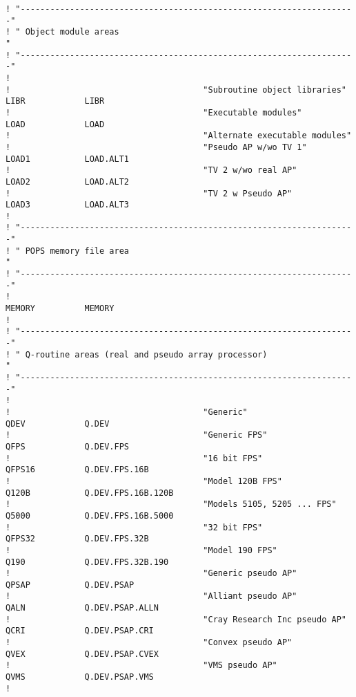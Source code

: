 \begin{verbatim}
! "--------------------------------------------------------------------"
! " Object module areas                                                "
! "--------------------------------------------------------------------"
!
!                                       "Subroutine object libraries"
LIBR            LIBR
!                                       "Executable modules"
LOAD            LOAD
!                                       "Alternate executable modules"
!                                       "Pseudo AP w/wo TV 1"
LOAD1           LOAD.ALT1
!                                       "TV 2 w/wo real AP"
LOAD2           LOAD.ALT2
!                                       "TV 2 w Pseudo AP"
LOAD3           LOAD.ALT3
!
! "--------------------------------------------------------------------"
! " POPS memory file area                                              "
! "--------------------------------------------------------------------"
!
MEMORY          MEMORY
!
! "--------------------------------------------------------------------"
! " Q-routine areas (real and pseudo array processor)                  "
! "--------------------------------------------------------------------"
!
!                                       "Generic"
QDEV            Q.DEV
!                                       "Generic FPS"
QFPS            Q.DEV.FPS
!                                       "16 bit FPS"
QFPS16          Q.DEV.FPS.16B
!                                       "Model 120B FPS"
Q120B           Q.DEV.FPS.16B.120B
!                                       "Models 5105, 5205 ... FPS"
Q5000           Q.DEV.FPS.16B.5000
!                                       "32 bit FPS"
QFPS32          Q.DEV.FPS.32B
!                                       "Model 190 FPS"
Q190            Q.DEV.FPS.32B.190
!                                       "Generic pseudo AP"
QPSAP           Q.DEV.PSAP
!                                       "Alliant pseudo AP"
QALN            Q.DEV.PSAP.ALLN
!                                       "Cray Research Inc pseudo AP"
QCRI            Q.DEV.PSAP.CRI
!                                       "Convex pseudo AP"
QVEX            Q.DEV.PSAP.CVEX
!                                       "VMS pseudo AP"
QVMS            Q.DEV.PSAP.VMS
!
\end{verbatim}
